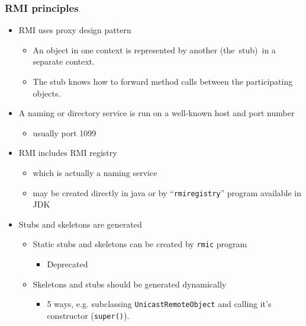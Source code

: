 \documentclass[10pt,xcolor=pdflatex]{beamer}
\begin{document}
\begin{frame}[containsverbatim]\frametitle{RMI principles}
\begin{itemize}
	\item RMI uses proxy design pattern
	  \begin{itemize}
		\item An object in one context is represented by another (the~stub)~in a separate context.
		\item The stub knows how to forward method calls between the participating objects.
	  \end{itemize}
    \item A naming or directory service is run on a well-known host and port number
	  \begin{itemize}
		\item usually port 1099
	  \end{itemize}
    \item RMI includes RMI registry
	  \begin{itemize}
		\item which is actually a naming service
		\item may be created directly in java or by “\texttt{rmiregistry}” program available in JDK
	  \end{itemize}
    \item Stubs and skeletons are generated
	  \begin{itemize}
		\item Static stubs and skeletons can be created by \texttt{rmic} program 
		  \begin{itemize}
		      \item Deprecated
		  \end{itemize}
		\item Skeletons and stubs should be generated dynamically
		  \begin{itemize}
		      \item 5 ways, e.g. subclassing \texttt{UnicastRemoteObject} and calling it's constructor (\texttt{super()}).
		  \end{itemize}
	  \end{itemize}
\end{itemize}
\end{frame}
\end{document}
